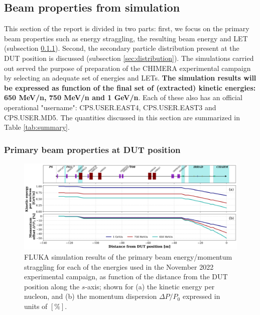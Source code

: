 \subsection{Beam properties from simulation}
This section of the report is divided in two parts: first, we focus on the primary beam properties such as energy straggling, the resulting beam energy and LET (subsection \ref{sec:primary}). Second, the secondary particle distribution present at the DUT position is discussed (subsection \ref{sec:distribution}). The simulations carried out served the purpose of preparation of the CHIMERA experimental campaign by selecting an adequate set of energies and LETs. \textbf{The simulation results will be expressed as function of the final set of (extracted) kinetic energies: 650 MeV/n, 750 MeV/n and 1 GeV/n}. Each of these also has an official operational "username": CPS.USER.EAST4, CPS.USER.EAST3 and CPS.USER.MD5.  The quantities discussed in this section are summarized in Table \ref{tab:summary}.

\subsubsection{Primary beam properties at DUT position}\label{sec:primary}

\begin{figure}[b!]
    \centering
    \includegraphics[width=\textwidth]{images/straggling.png}
    \vspace*{-0.5cm}
    \caption{FLUKA simulation results of the primary beam energy/momentum straggling for each of the energies used in the November 2022 experimental campaign, as function of the distance from the DUT position along the $s$-axis; shown for (a) the kinetic energy per nucleon, and (b) the momentum dispersion $\Delta P/P_0$ expressed in units of $[\%]$.}
    \label{fig:straggling_mean}
\end{figure}

